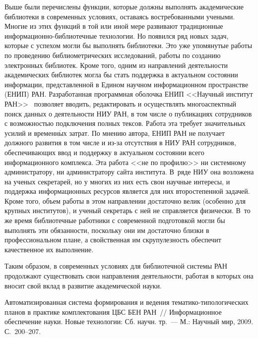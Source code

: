 \begin{multicols}{2}
   Выше были перечислены функции, которые должны выполнять академические 
библиотеки в современных условиях, оставаясь востребованными учеными. Многие из 
этих функций в той или иной мере развивают традиционные 
ин\-фор\-ма\-ци\-он\-но-биб\-лио\-теч\-ные технологии. Но появился ряд новых задач, которые с успехом могли бы 
выполнять библиотеки. Это уже упомянутые работы по проведению библиометрических 
исследований, работы по созданию электронных библиотек. Кроме того, одним из 
направлений деятельности академических библиотек могла бы стать поддержка в 
актуальном состоянии информации, представленной в Едином научном информационном 
пространстве (ЕНИП) РАН. Разработанная программная оболочка ЕНИП <<Научный 
институт РАН>>~\cite{13kale} позволяет вводить, редактировать и осуществлять 
многоаспектный поиск данных о деятельности НИУ РАН, в том числе о публикациях 
сотрудников с возможностью подключения полных тексов. Работа эта требует 
значительных усилий и временн$\acute{\mbox{ы}}$х затрат. По мнению автора, ЕНИП РАН не получает 
должного развития в том числе и из-за отсутствия в НИУ РАН сотрудников, 
обеспечивающих ввод и поддержку в актуальном состоянии всего информационного 
комплекса. Эта работа <<не по профилю>> ни системному администратору, ни 
администратору сайта института. В~ряде НИУ она возложена на ученых секретарей, но у 
многих из них есть свои научные интересы, и поддержка информационных ресурсов 
является для них второстепенной задачей. Кроме того, объем работы в этом направлении 
достаточно велик (особенно для крупных институтов), и ученый секретарь с ней не 
справляется физически. В~то же время библиотечные работники с современной 
подготовкой могли бы выполнять эти обязанности, поскольку они им достаточно близки в 
профессиональном плане, а свойственная им скрупулезность обеспечит качественное их 
выполнение. 
   
   Таким образом, в современных условиях для биб\-лио\-теч\-ной системы РАН продолжают 
существовать свои направления деятельности, работая в которых она вносит свой вклад в 
развитие академической науки. 

{\small\frenchspacing
{%
\begin{thebibliography}{99}


Автоматизированная система формирования и ведения 
те\-ма\-ти\-ко-ти\-по\-ло\-ги\-че\-ских планов в практике комплектования ЦБС БЕН 
РАН~// Информационное обеспечение науки. Новые технологии: Сб. научн. тр.~--- 
М.: Научный мир, 2009. С.~200--207. 


\end{thebibliography}}}
\end{multicols}
